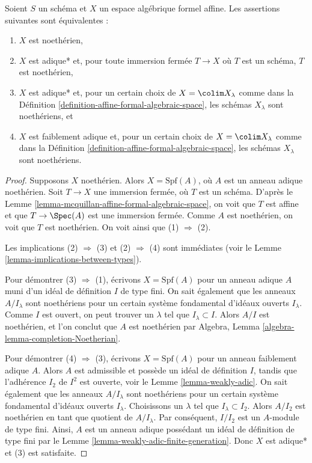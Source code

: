 \begin{lemma}
\label{lemma-characterize-noetherian-affine}
Soient $S$ un schéma et $X$ un espace algébrique formel affine.
Les assertions suivantes sont équivalentes :
\begin{enumerate}
\item $X$ est noethérien,
\item $X$ est adique* et, pour toute immersion fermée $T \to X$ où $T$ est un schéma,
$T$ est noethérien,
\item $X$ est adique* et, pour un certain choix de $X = \colim X_\lambda$ comme dans la
Définition \ref{definition-affine-formal-algebraic-space},
les schémas $X_\lambda$ sont noethériens, et
\item $X$ est faiblement adique et, pour un certain choix de $X = \colim X_\lambda$
comme dans la Définition \ref{definition-affine-formal-algebraic-space},
les schémas $X_\lambda$ sont noethériens.
\end{enumerate}
\end{lemma}

\begin{proof}
Supposons $X$ noethérien. Alors $X = \text{Spf}(A)$, où
$A$ est un anneau adique noethérien.
Soit $T \to X$ une immersion fermée, où $T$ est un schéma.
D'après le Lemme \ref{lemma-mcquillan-affine-formal-algebraic-space},
on voit que $T$ est affine et que $T \to \Spec(A)$ est une immersion
fermée. Comme $A$ est noethérien, on voit que $T$ est noethérien.
On voit ainsi que (1) $\Rightarrow$ (2).

\medskip\noindent
Les implications (2) $\Rightarrow$ (3) et (2) $\Rightarrow$ (4) sont
immédiates (voir le Lemme \ref{lemma-implications-between-types}).

\medskip\noindent
Pour démontrer (3) $\Rightarrow$ (1), écrivons $X = \text{Spf}(A)$
pour un anneau adique $A$ muni d'un idéal de définition $I$ de type fini.
On sait également que les anneaux $A/I_\lambda$ sont noethériens
pour un certain système fondamental d'idéaux ouverts $I_\lambda$.
Comme $I$ est ouvert, on peut trouver un $\lambda$ tel que $I_\lambda \subset I$.
Alors $A/I$ est noethérien, et l'on conclut que $A$ est noethérien par
Algebra, Lemma \ref{algebra-lemma-completion-Noetherian}.

\medskip\noindent
Pour démontrer (4) $\Rightarrow$ (3), écrivons $X = \text{Spf}(A)$
pour un anneau faiblement adique $A$. Alors $A$ est admissible et
possède un idéal de définition $I$, tandis que l'adhérence $I_2$ de $I^2$
est ouverte, voir le Lemme \ref{lemma-weakly-adic}.
On sait également que les anneaux $A/I_\lambda$ sont noethériens
pour un certain système fondamental d'idéaux ouverts $I_\lambda$.
Choisissons un $\lambda$ tel que $I_\lambda \subset I_2$.
Alors $A/I_2$ est noethérien en tant que quotient de $A/I_\lambda$.
Par conséquent, $I/I_2$ est un $A$-module de type fini.
Ainsi, $A$ est un anneau adique possédant un idéal de définition
de type fini par le Lemme \ref{lemma-weakly-adic-finite-generation}.
Donc $X$ est adique* et (3) est satisfaite.
\end{proof}





